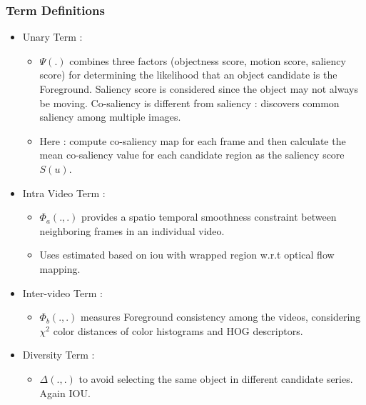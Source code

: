 \documentclass{article}
\begin{document}
\subsubsection{Term Definitions}
\begin{itemize}
\item Unary Term :
  \begin{itemize}
  \item $\Psi(.)$ combines three factors (objectness score, motion score, saliency score) for determining the likelihood that an object candidate is the Foreground. Saliency score is considered since the object may not always be moving. Co-saliency is different from saliency : discovers common saliency among multiple images.
  \item Here : compute co-saliency map for each frame and then calculate the mean co-saliency value for each candidate region as the saliency score $S(u)$.
  \end{itemize}
\item Intra Video Term :
  \begin{itemize}
  \item $\Phi_a(., .)$ provides a spatio temporal smoothness constraint between neighboring frames in an individual video.
  \item Uses estimated based on iou with wrapped region w.r.t optical flow mapping.
  \end{itemize}
\item Inter-video Term :
  \begin{itemize}
  \item $\Phi_b(.,.)$ measures Foreground consistency among the videos, considering $\chi^2$ color distances of color histograms and HOG descriptors.
  \end{itemize}
\item Diversity Term :
  \begin{itemize}
  \item $\Delta(.,.)$ to avoid selecting the same object in different candidate series. Again IOU.
  \end{itemize}
\end{itemize}
\end{document}

